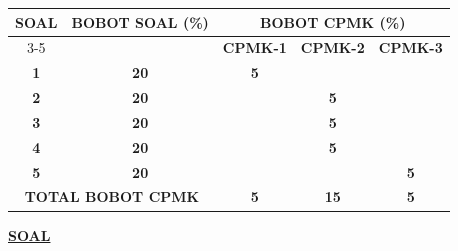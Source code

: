 \documentclass[11pt,letterpaper]{article}
\begin{document}
\begin{center}
  \begin{tabular}{|c|c|c|c|c|}
    \hline
    \multirow{2}{*}{\textbf{SOAL}}                  & \multirow{2}{*}{\textbf{BOBOT SOAL (\%)}} & \multicolumn{3}{c|}{\textbf{BOBOT CPMK (\%)}}                                     \\ \cline{3-5}
                                                    &                                           & \textbf{CPMK-1}                               & \textbf{CPMK-2} & \textbf{CPMK-3} \\ \hline
    \textbf{1}                                      & \textbf{20}                               & \textbf{5}                                    &                 &                 \\ \hline
    \textbf{2}                                      & \textbf{20}                               &                                               & \textbf{5}      &                 \\ \hline
    \textbf{3}                                      & \textbf{20}                               &                                               & \textbf{5}      &                 \\ \hline
    \textbf{4}                                      & \textbf{20}                               &                                               & \textbf{5}      &                 \\ \hline
    \textbf{5}                                      & \textbf{20}                               &                                               &                 & \textbf{5}      \\ \hline
    \multicolumn{2}{|c|}{\textbf{TOTAL BOBOT CPMK}} & \textbf{5}                                & \textbf{15}                                   & \textbf{5}                        \\ \hline
  \end{tabular}
\end{center}

\vspace{0.25cm}
\begin{center}
  \underline{\textbf{SOAL}}
\end{center}
\end{document}
